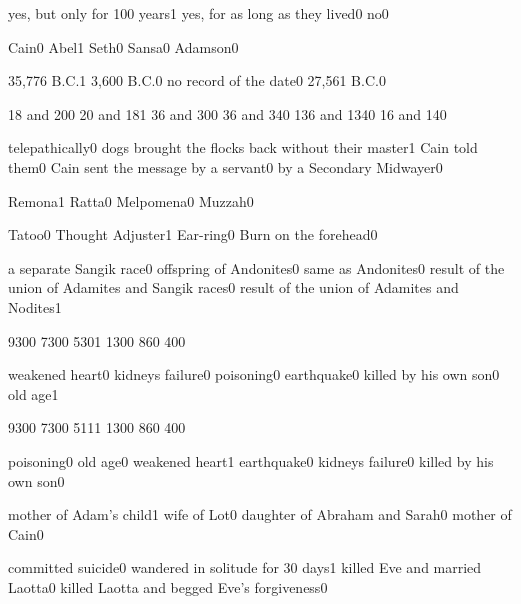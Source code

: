 {yes, but only for 100 years}{1}
{yes, for as long as they lived}{0}
{no}{0}
\qstop

{Cain}{0}
{Abel}{1}
{Seth}{0}
{Sansa}{0}
{Adamson}{0}
\qstop

{35,776 B.C.}{1}
{3,600 B.C.}{0}
{no record of the date}{0}
{27,561 B.C.}{0}
\qstop

{18 and 20}{0}
{20 and 18}{1}
{36 and 30}{0}
{36 and 34}{0}
{136 and 134}{0}
{16 and 14}{0}
\qstop

{telepathically}{0}
{dogs brought the flocks back without their master}{1}
{Cain told them}{0}
{Cain sent the message by a servant}{0}
{by a Secondary Midwayer}{0}
\qstop

{Remona}{1}
{Ratta}{0}
{Melpomena}{0}
{Muzzah}{0}
\qstop

{Tatoo}{0}
{Thought Adjuster}{1}
{Ear-ring}{0}
{Burn on the forehead}{0}
\qstop

{a separate Sangik race}{0}
{offspring of Andonites}{0}
{same as Andonites}{0}
{result of the union of Adamites and Sangik races}{0}
{result of the union of Adamites and Nodites}{1}
\qstop

{930}{0}
{730}{0}
{530}{1}
{130}{0}
{86}{0}
{40}{0}
\qstop

{weakened heart}{0}
{kidneys failure}{0}
{poisoning}{0}
{earthquake}{0}
{killed by his own son}{0}
{old age}{1}
\qstop

{930}{0}
{730}{0}
{511}{1}
{130}{0}
{86}{0}
{40}{0}
\qstop

{poisoning}{0}
{old age}{0}
{weakened heart}{1}
{earthquake}{0}
{kidneys failure}{0}
{killed by his own son}{0}
\qstop

{mother of Adam's child}{1}
{wife of Lot}{0}
{daughter of Abraham and Sarah}{0}
{mother of Cain}{0}
\qstop

{committed suicide}{0}
{wandered in solitude for 30 days}{1}
{killed Eve and married Laotta}{0}
{killed Laotta and begged Eve's forgiveness}{0}
\qstop



